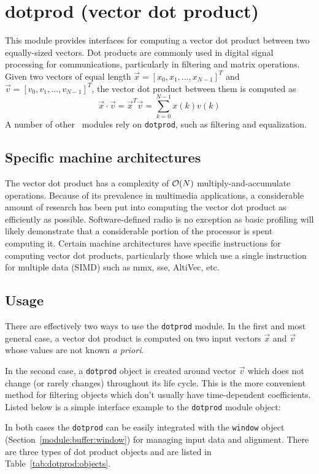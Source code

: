 % 
%

\newpage
\section{dotprod (vector dot product)}
\label{module:dotprod}

This module provides interfaces for computing a vector dot product
between two equally-sized vectors.
Dot products are commonly used in digital signal processing for
communications, particularly in filtering and matrix operations.
%
Given two vectors of equal length
$\vec{x} = \left[x_0,x_1,\ldots,x_{N-1}\right]^T$ and
$\vec{v} = \left[v_0,v_1,\ldots,v_{N-1}\right]^T$,
the vector dot product between them is computed as
%
\begin{equation}
    \vec{x} \cdot \vec{v}   =
    \vec{x}^T \vec{v}       =
    \sum_{k=0}^{N-1}{ x(k) v(k) }
\end{equation}
%
A number of other \liquid\ modules rely on {\tt dotprod},
such as filtering and equalization.

\subsection{Specific machine architectures}
\label{module:dotprod:arch}
The vector dot product has a complexity of $\mathcal{O}(N)$ multiply-and-accumulate
operations.
Because of its prevalence in multimedia applications, a considerable amount of
research has been put into computing the vector dot product as efficiently as
possible.
Software-defined radio is no exception as basic profiling will likely
demonstrate that a considerable portion of the processor is spent computing
it.
Certain machine architectures have specific instructions for computing vector
dot products, particularly those which use a single instruction for
multiple data (SIMD) such as mmx, sse, AltiVec, etc.

\subsection{Usage}
\label{module:dotprod:usage}
There are effectively two ways to use the {\tt dotprod} module.
In the first and most general case, a vector dot product is computed on two
input vectors $\vec{x}$ and $\vec{v}$ whose values are not known
{\it a priori}.

In the second case, a {\tt dotprod} object is created around vector $\vec{v}$
which does not change (or rarely changes) throughout its life cycle.
This is the more convenient method for filtering objects which don't usually
have time-dependent coefficients.
Listed below is a simple interface example to the {\tt dotprod} module
object:
%

%
In both cases the {\tt dotprod} can be easily integrated with the
{\tt window} object (Section~\ref{module:buffer:window})
for managing input data and alignment.
There are three types of dot product objects and are listed in
Table~\ref{tab:dotprod:objects}.

